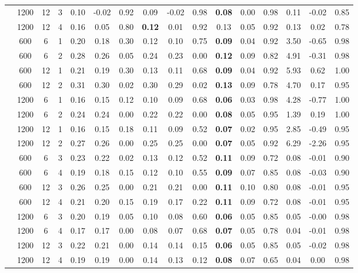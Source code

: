 \begin{table}[ht]
\begin{tabular}{||c|ccc||ccc|ccc|ccc|ccc}
   & 1200 & 12 & 3 & 0.10 & -0.02 & 0.92 & 0.09 & -0.02 & 0.98 & \bf 0.08 & 0.00 & 0.98 & 0.11 & -0.02 & 0.85 \\ 
   & 1200 & 12 & 4 & 0.16 & 0.05 & 0.80 & \bf 0.12 & 0.01 & 0.92 & 0.13 & 0.05 & 0.92 & 0.13 & 0.02 & 0.78 \\ 
   \hline
 & 600 & 6 & 1 & 0.20 & 0.18 & 0.30 & 0.12 & 0.10 & 0.75 & \bf 0.09 & 0.04 & 0.92 & 3.50 & -0.65 & 0.98 \\ 
   & 600 & 6 & 2 & 0.28 & 0.26 & 0.05 & 0.24 & 0.23 & 0.00 & \bf 0.12 & 0.09 & 0.82 & 4.91 & -0.31 & 0.98 \\ 
   & 600 & 12 & 1 & 0.21 & 0.19 & 0.30 & 0.13 & 0.11 & 0.68 & \bf 0.09 & 0.04 & 0.92 & 5.93 & 0.62 & 1.00 \\ 
   & 600 & 12 & 2 & 0.31 & 0.30 & 0.02 & 0.30 & 0.29 & 0.02 & \bf 0.13 & 0.09 & 0.78 & 4.70 & 0.17 & 0.95 \\ 
   & 1200 & 6 & 1 & 0.16 & 0.15 & 0.12 & 0.10 & 0.09 & 0.68 & \bf 0.06 & 0.03 & 0.98 & 4.28 & -0.77 & 1.00 \\ 
   & 1200 & 6 & 2 & 0.24 & 0.24 & 0.00 & 0.22 & 0.22 & 0.00 & \bf 0.08 & 0.05 & 0.95 & 1.39 & 0.19 & 1.00 \\ 
   & 1200 & 12 & 1 & 0.16 & 0.15 & 0.18 & 0.11 & 0.09 & 0.52 & \bf 0.07 & 0.02 & 0.95 & 2.85 & -0.49 & 0.95 \\ 
   & 1200 & 12 & 2 & 0.27 & 0.26 & 0.00 & 0.25 & 0.25 & 0.00 & \bf 0.07 & 0.05 & 0.92 & 6.29 & -2.26 & 0.95 \\ 
   \hline
 & 600 & 6 & 3 & 0.23 & 0.22 & 0.02 & 0.13 & 0.12 & 0.52 & \bf 0.11 & 0.09 & 0.72 & 0.08 & -0.01 & 0.90 \\ 
   & 600 & 6 & 4 & 0.19 & 0.18 & 0.15 & 0.12 & 0.10 & 0.55 & \bf 0.09 & 0.07 & 0.85 & 0.08 & -0.03 & 0.90 \\ 
   & 600 & 12 & 3 & 0.26 & 0.25 & 0.00 & 0.21 & 0.21 & 0.00 & \bf 0.11 & 0.10 & 0.80 & 0.08 & -0.01 & 0.95 \\ 
   & 600 & 12 & 4 & 0.21 & 0.20 & 0.15 & 0.19 & 0.17 & 0.22 & \bf 0.11 & 0.09 & 0.72 & 0.08 & -0.01 & 0.95 \\ 
   & 1200 & 6 & 3 & 0.20 & 0.19 & 0.05 & 0.10 & 0.08 & 0.60 & \bf 0.06 & 0.05 & 0.85 & 0.05 & -0.00 & 0.98 \\ 
   & 1200 & 6 & 4 & 0.17 & 0.17 & 0.00 & 0.08 & 0.07 & 0.68 & \bf 0.07 & 0.05 & 0.78 & 0.04 & -0.01 & 0.98 \\ 
   & 1200 & 12 & 3 & 0.22 & 0.21 & 0.00 & 0.14 & 0.14 & 0.15 & \bf 0.06 & 0.05 & 0.85 & 0.05 & -0.02 & 0.98 \\ 
   & 1200 & 12 & 4 & 0.19 & 0.19 & 0.00 & 0.14 & 0.13 & 0.12 & \bf 0.08 & 0.07 & 0.65 & 0.04 & 0.00 & 0.98 \\ 
   \hline
\hline
\end{tabular}
\end{table}

